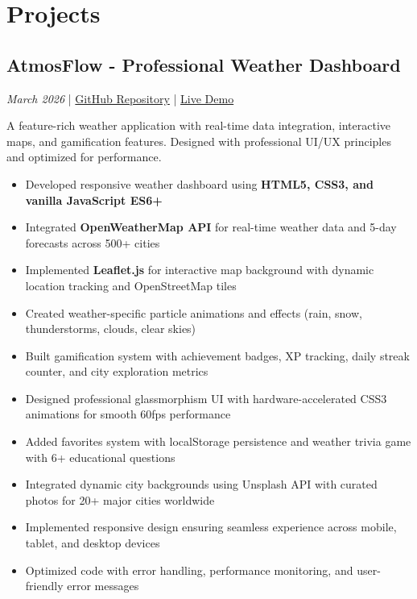
\section{Projects}

\subsection*{AtmosFlow - Professional Weather Dashboard}
\textit{March 2026} | \href{https://github.com/Vai-luc/AtmosFlow-Weather-app}{GitHub Repository} | \href{http://localhost:8000}{Live Demo}

A feature-rich weather application with real-time data integration, interactive maps, and gamification features. Designed with professional UI/UX principles and optimized for performance.

\begin{itemize}[leftmargin=0.15in, itemsep=2pt]
    \item Developed responsive weather dashboard using \textbf{HTML5, CSS3, and vanilla JavaScript ES6+}
    \item Integrated \textbf{OpenWeatherMap API} for real-time weather data and 5-day forecasts across 500+ cities
    \item Implemented \textbf{Leaflet.js} for interactive map background with dynamic location tracking and OpenStreetMap tiles
    \item Created weather-specific particle animations and effects (rain, snow, thunderstorms, clouds, clear skies)
    \item Built gamification system with achievement badges, XP tracking, daily streak counter, and city exploration metrics
    \item Designed professional glassmorphism UI with hardware-accelerated CSS3 animations for smooth 60fps performance
    \item Added favorites system with localStorage persistence and weather trivia game with 6+ educational questions
    \item Integrated dynamic city backgrounds using Unsplash API with curated photos for 20+ major cities worldwide
    \item Implemented responsive design ensuring seamless experience across mobile, tablet, and desktop devices
    \item Optimized code with error handling, performance monitoring, and user-friendly error messages
\end{itemize}

